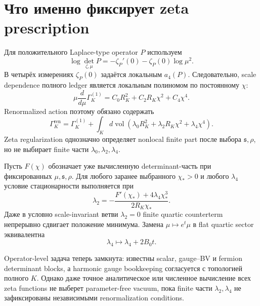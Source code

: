 \section{Что именно фиксирует zeta prescription}

Для положительного Laplace-type operator \(P\) используем
\begin{equation}
 \log\det_{\zeta,\mu}P
 =-\zeta_P'(0)-\zeta_P(0)\log\mu^2.
\end{equation}
В четырёх измерениях \(\zeta_P(0)\) задаётся локальным \(a_4(P)\).
Следовательно, scale dependence полного ledger является локальным
полиномом по постоянному \(\chi\):
\begin{equation}
 \mu\frac{d}{d\mu}\Gamma_K^{(1)}
 =C_0R_K^2+C_2R_K\chi^2+C_4\chi^4.
\end{equation}
Renormalized action поэтому обязано содержать
\begin{equation}
 \Gamma_K^{\mathrm{ren}}
 =\Gamma_K^{(1)}
 +\int_Kd\operatorname{vol}
 \left(
 \lambda_0R_K^2+\lambda_2R_K\chi^2+\lambda_4\chi^4
 \right).
 \label{eq:base-k-local-completion}
\end{equation}
Zeta regularization однозначно определяет nonlocal finite part после
выбора \(\mathfrak s,\rho\), но не выбирает finite части
\(\lambda_0,\lambda_2,\lambda_4\).

Пусть \(F(\chi)\) обозначает уже вычисленную determinant-часть при
фиксированных \(\mu,\mathfrak s,\rho\). Для любого заранее выбранного
\(\chi_*>0\) и любого \(\lambda_4\) условие стационарности выполняется при
\begin{equation}
 \lambda_2
 =-\frac{F'(\chi_*)+4\lambda_4\chi_*^3}
 {2R_K\chi_*}.
\end{equation}
Даже в условно scale-invariant ветви \(\lambda_2=0\) finite quartic
counterterm непрерывно сдвигает положение минимума. Замена
\(\mu\mapsto e^t\mu\) в flat quartic sector эквивалентна
\begin{equation}
 \lambda_4\mapsto\lambda_4+2B_0t.
\end{equation}

\begin{theorem}
Operator-level задача теперь замкнута: известны scalar, gauge--BV и
fermion determinant blocks, а harmonic gauge bookkeeping согласуется с
топологией полного \(K\). Однако даже точное аналитическое или численное
вычисление всех zeta functions не выберет parameter-free vacuum, пока
finite части \(\lambda_2,\lambda_4\) не зафиксированы независимыми
renormalization conditions.
\end{theorem}

